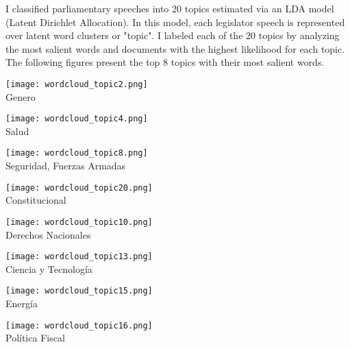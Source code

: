 \documentclass{article}
\begin{document}
I classified parliamentary speeches into 20 topics estimated via an LDA model (Latent Dirichlet Allocation). In this model, each legislator speech is represented over latent word clusters or "topic". I labeled each of the 20 topics by analyzing the most salient words and documents with the highest likelihood for each topic. The following figures present the top 8 topics with their most salient words. 


\begin{minipage}{0.25\textwidth}\raggedleft
	\texttt{[image: wordcloud\_topic2.png]} \\
	\centering \scriptsize{Genero}
\end{minipage}
\begin{minipage}{0.25\textwidth}\raggedleft
	\texttt{[image: wordcloud\_topic4.png]} \\
	\centering \scriptsize{Salud}
\end{minipage}
\begin{minipage}{0.25\textwidth}\raggedleft
	\texttt{[image: wordcloud\_topic8.png]} \\
	\centering \scriptsize{Seguridad, Fuerzas Armadas}
\end{minipage}
\begin{minipage}{0.25\textwidth}\raggedleft
	\texttt{[image: wordcloud\_topic20.png]} \\
	\centering \scriptsize{Constitucional}
\end{minipage}
\begin{minipage}{0.25\textwidth}\raggedleft
	\texttt{[image: wordcloud\_topic10.png]} \\
	\centering \scriptsize{Derechos Nacionales }
\end{minipage}
\begin{minipage}{0.25\textwidth}\raggedleft
	\texttt{[image: wordcloud\_topic13.png]} \\
	\centering \scriptsize{Ciencia y Tecnología}
\end{minipage}
\begin{minipage}{0.25\textwidth}\raggedleft
	\texttt{[image: wordcloud\_topic15.png]} \\
	\centering \scriptsize{Energía}
\end{minipage}
\begin{minipage}{0.25\textwidth}\raggedleft
	\texttt{[image: wordcloud\_topic16.png]} \\
	\centering \scriptsize{Política Fiscal}
\end{minipage}
\end{document}
